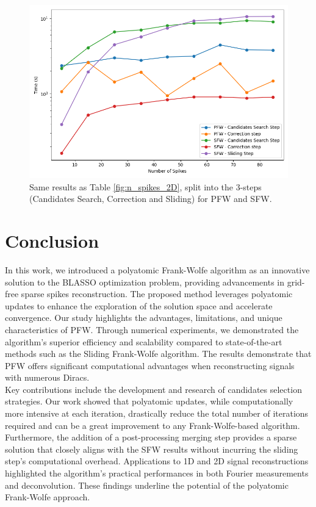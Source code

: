 \documentclass[a4paper,12pt,oneside]{report}
\theoremstyle{named}
\begin{document}
\begin{figure}
\centering
\includegraphics[width=1\linewidth]{n_spikes_2D_2.png}
\caption{Same results as Table \ref{fig:n_spikes_2D}, split into the 3-steps (Candidates Search, Correction and Sliding) for PFW and SFW.}
\label{fig:n_spikes_2D2}
\end{figure}

\chapter{Conclusion}

In this work, we introduced a polyatomic Frank-Wolfe algorithm as an innovative solution to the BLASSO optimization problem, providing advancements in grid-free sparse spikes reconstruction. The proposed method leverages polyatomic updates to enhance the exploration of the solution space and accelerate convergence. Our study highlights the advantages, limitations, and unique characteristics of PFW. Through numerical experiments, we demonstrated the algorithm's superior efficiency and scalability compared to state-of-the-art methods such as the Sliding Frank-Wolfe algorithm. The results demonstrate that PFW offers significant computational advantages when reconstructing signals with numerous Diracs. \\

Key contributions include the development and research of candidates selection strategies. Our work showed that polyatomic updates, while computationally more intensive at each iteration, drastically reduce the total number of iterations required and can be a great improvement to any Frank-Wolfe-based algorithm. Furthermore, the addition of a post-processing merging step provides a sparse solution that closely aligns with the SFW results without incurring the sliding step's computational overhead. Applications to 1D and 2D signal reconstructions highlighted the algorithm's practical performances in both Fourier measurements and deconvolution. These findings underline the potential of the polyatomic Frank-Wolfe approach.\\
\end{document}
